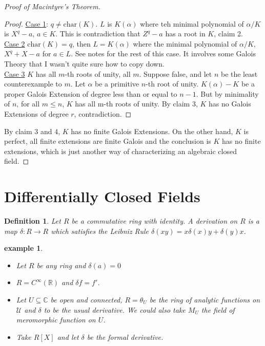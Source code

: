 \documentclass[letterpaper, 12pt]{article}
\newcommand{\fin}{\qquad \quad \hfill \framebox[1.75mm][l]{\,}}
\newcommand{\cU}{\mathcal{U}}
\newcommand{\bR}{\mathbb{R}}
\newcommand{\bC} {\mathbb{C}}
\theoremstyle{stdthm}
\theoremstyle{stddef}
\newtheorem{defn}[thm]{Definition}
\newtheorem{eg}[thm]{example} %
\theoremstyle{stdnonum}
\theoremstyle{stdqands}
\theoremstyle{stdbold}
\begin{document}
\begin{proof}[Proof of Macintyre's Theorem]
\begin{proof}
\underline{Case 1}: $q \neq \mbox{char}(K)$. $L$ is $K(\alpha)$ where teh minimal polynomial of $\alpha/K$ is $X^q - a$, $a \in K$. This is contradiction that $Z^q - a$ has a root in $K$, claim 2. \\

\underline{Case 2} $\mbox{char}(K) = q$, then $L = K(\alpha)$ where the minimal polynomial of $\alpha/K$, $X^q + X - a$ for $a \in L$. See notes for the rest of this case. It involves some Galois Theory that I wasn't quite sure how to copy down. \\

\underline{Case 3} $K$ has all $m$-th roots of unity, all $m$. Suppose false, and let $n$ be the least counterexample to $m$. Let $\alpha$ be a primitive $n$-th root of unity. $K(\alpha) - K$ be a proper Galois Extension of degree less than or equal to $n-1$.  But by minimality of $n$, for all $m\leq n$, $K$ has all m-th roots of unity. By claim 3, $K$ has no Galois Extensions of degree $r$, contradiction. 
\end{proof}


By claim 3 and 4, $K$ has no finite Galois Extensions. On the other hand, $K$ is perfect, all finite extensions are finite Galois and the conclusion is $K$ has no finite extensions, which is just another way of characterizing an algebraic closed field. 
\end{proof}


\section*{Differentially Closed Fields}

\begin{defn}
Let $R$ be a commutative ring with identity.  A derivation on $R$ is a map $\delta: R\to R$ which satisfies the Leibniz Rule $\delta(xy) = x\delta(x)y + \delta(y)x$. 
\end{defn}


\begin{eg}
\begin{itemize}
\item Let $R$ be any ring and $\delta(a) = 0$
\item $R = C^\infty(\bR)$ and $\delta f = f'$. 
\item Let $U \subseteq \bC$ be open and connected, $R = \theta_U$ be the ring of analytic functions on $\cU$ and $\delta$ to be the usual derivative. We could also take $M_U$ the field of meromorphic function on $U$. 
\item Take $R[X]$ and let $\delta$ be the formal derivative. 
\end{itemize}

\end{eg}
\end{document}
